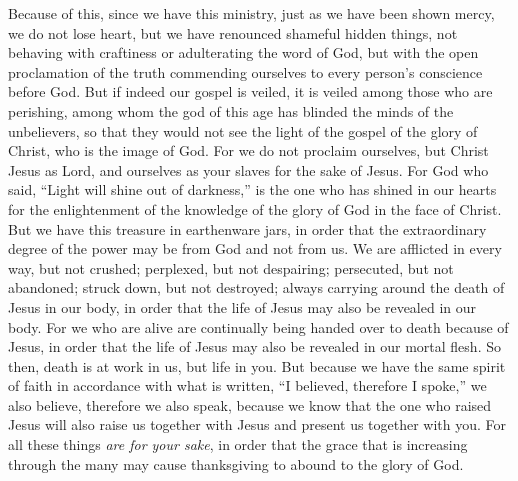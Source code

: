 \begin{biblechapter} %
 Because of this, since we have this ministry, just as we have been shown mercy, we do not lose heart,
\verse but we have renounced shameful hidden things, not behaving with craftiness or adulterating the word of God, but with the open proclamation of the truth commending ourselves to every person’s conscience before God.
\verse But if indeed our gospel is veiled, it is veiled among those who are perishing,
\verse among whom the god of this age has blinded the minds of the unbelievers, so that they would not see the light of the gospel of the glory of Christ, who is the image of God.
\verse For we do not proclaim ourselves, but Christ Jesus as Lord, and ourselves as your slaves for the sake of Jesus.
\verse For God who said, “Light will shine out of darkness,” is the one who has shined in our hearts for the enlightenment of the knowledge of the glory of God in the face of Christ.
 But we have this treasure in earthenware jars, in order that the extraordinary degree of the power may be from God and not from us.
\verse We are afflicted in every way, but not crushed; perplexed, but not despairing;
\verse persecuted, but not abandoned; struck down, but not destroyed;
\verse always carrying around the death of Jesus in our body, in order that the life of Jesus may also be revealed in our body.
\verse For we who are alive are continually being handed over to death because of Jesus, in order that the life of Jesus may also be revealed in our mortal flesh.
\verse So then, death is at work in us, but life in you.
\verse But because we have the same spirit of faith in accordance with what is written, “I believed, therefore I spoke,” we also believe, therefore we also speak,
\verse because we know that the one who raised Jesus will also raise us together with Jesus and present us together with you.
\verse For all these things \textit{are for your sake}, in order that the grace that is increasing through the many may cause thanksgiving to abound to the glory of God.

\end{biblechapter}
